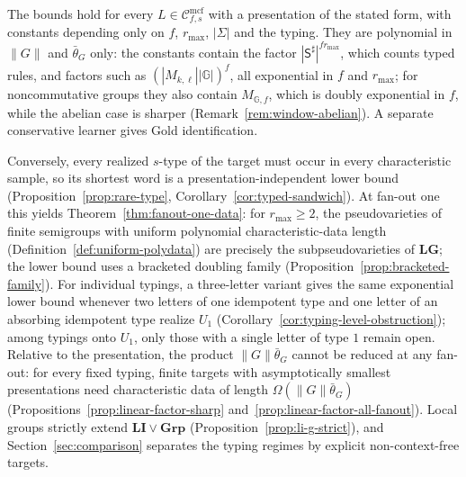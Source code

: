 \documentclass[11pt]{article}
\numberwithin{equation}{section}
\theoremstyle{plain}
\theoremstyle{definition}
\theoremstyle{remark}
\newcommand{\Cmcf}[2]{\mathcal{C}^{\mathrm{mcf}}_{#1,#2}}
\begin{document}
\noindent
The bounds hold for every $L\in\Cmcf{f}{s}$ with a presentation of the
stated form, with constants depending only on $f$, $r_{\max}$, $|\Sigma|$ and
the typing.  They are polynomial in $\|G\|$ and $\bar\theta_G$ only: the
constants contain the factor
$|\mathsf S^\sharp|^{fr_{\max}}$, which counts typed rules, and factors such as
$(|M_{k,\ell}||\mathbb G|)^f$, all exponential in $f$ and $r_{\max}$; for
noncommutative groups they also contain $M_{\mathbb G,f}$, which is doubly
exponential in $f$, while the abelian case is sharper
(Remark~\ref{rem:window-abelian}).  A separate conservative
learner gives Gold identification.

Conversely, every realized $s$-type of the target must occur in every
characteristic sample, so its shortest word is a presentation-independent
lower bound (Proposition~\ref{prop:rare-type},
Corollary~\ref{cor:typed-sandwich}).  At fan-out one this yields
Theorem~\ref{thm:fanout-one-data}: for $r_{\max}\ge2$, the pseudovarieties of
finite semigroups with uniform polynomial characteristic-data length
(Definition~\ref{def:uniform-polydata}) are precisely the subpseudovarieties
of $\mathbf{LG}$; the lower bound uses a bracketed doubling family
(Proposition~\ref{prop:bracketed-family}).  For individual typings, a
three-letter variant gives the same exponential lower bound whenever two letters
of one idempotent type and one letter of an absorbing idempotent type realize
$U_1$ (Corollary~\ref{cor:typing-level-obstruction}); among typings onto $U_1$,
only those with a single letter of type $1$ remain open.  Relative to the presentation,
the product $\|G\|\bar\theta_G$ cannot be reduced at any fan-out: for every
fixed typing, finite targets with asymptotically smallest presentations
need characteristic data of length $\Omega(\|G\|\bar\theta_G)$
(Propositions~\ref{prop:linear-factor-sharp}
and~\ref{prop:linear-factor-all-fanout}).  Local groups strictly extend
$\mathbf{LI}\vee\mathbf{Grp}$ (Proposition~\ref{prop:li-g-strict}), and
Section~\ref{sec:comparison} separates the typing regimes by explicit
non-context-free targets.
\end{document}
